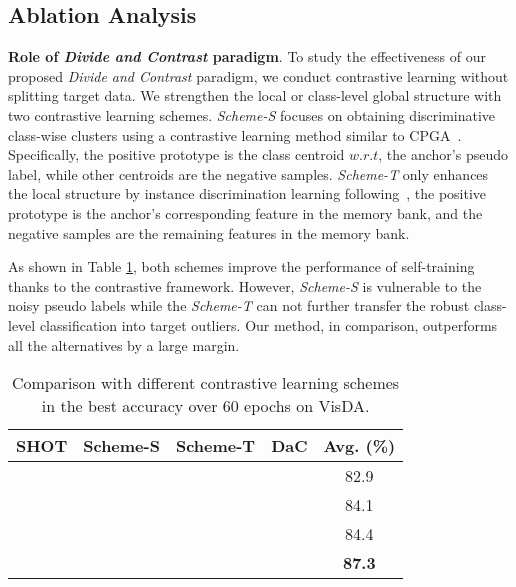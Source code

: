 \documentclass{article}
\newcommand{\cmark}{\ding{51}}\newcommand{\xmark}{\ding{55}}\usepackage{amsthm}
\begin{document}
\subsection{Ablation Analysis}\label{sec:ablation}
\textbf{Role of \textit{Divide and Contrast} paradigm}. 
To study the effectiveness of our proposed \textit{Divide and Contrast} paradigm, we conduct contrastive learning without splitting target data. We strengthen the local or class-level global structure with two contrastive learning schemes. \textit{Scheme-S}
focuses on obtaining discriminative class-wise clusters using a contrastive learning method similar to CPGA~\cite{Qiu2021ijcai}. Specifically, the positive prototype is the class centroid $w.r.t$, the anchor's pseudo label, while other centroids are the negative samples.
\textit{Scheme-T} only enhances the local structure by instance discrimination learning following~\cite{chen2020simclr,CPC_2018}, the positive prototype is the anchor's corresponding feature in the memory bank, and the negative samples are the remaining features in the memory bank.

As shown in Table \ref{tab:ablation1}, both schemes improve the performance of self-training thanks to the contrastive framework. However, \textit{Scheme-S} is vulnerable to the noisy pseudo labels while the \textit{Scheme-T} can not further transfer the robust class-level classification into target outliers.
Our method, in comparison, outperforms all the alternatives by a large margin.


\begin{table}[!htbp]
    \vspace{-3mm}
    \centering
     \caption{Comparison with different contrastive learning schemes in the best accuracy over 60 epochs on VisDA.}
     \label{tab:ablation1}
    \begin{tabular}{cccc|c}
					\toprule
					SHOT & Scheme-S & Scheme-T & DaC  & \multicolumn{1}{|c}{Avg. (\%)} \\
					\midrule
\bm{\cmark}& & & & \multicolumn{1}{|c}{82.9}\\
					\bm{\cmark}&\bm{\cmark}& & & \multicolumn{1}{|c}{84.1}\\
					\bm{\cmark}&            &\bm{\cmark}&    &\multicolumn{1}{|c}{84.4}\\
					&&& \bm{\cmark}&  \multicolumn{1}{|c}{\textbf{87.3}}\\
\bottomrule
		\end{tabular}
    \vspace{-3mm}
\end{table}
\end{document}
